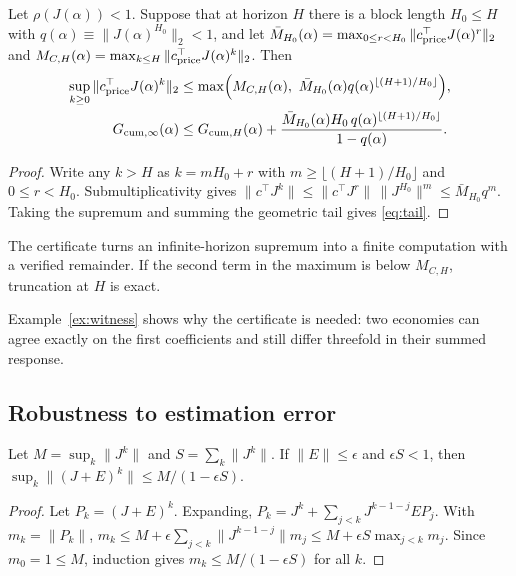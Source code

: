 \begin{lemma}\label{lem:tail}
Let $\rho(J(\alpha))<1$. Suppose that at horizon $H$ there is a block length $H_0\le H$ with $q(\alpha)\equiv\|J(\alpha)^{H_0}\|_2<1$, and let $\bar M_{H_0}(\alpha)=\max_{0\le r<H_0}\|c^\top_{\rm price}J(\alpha)^r\|_2$ and $M_{C,H}(\alpha)=\max_{k\le H}\|c^\top_{\rm price}J(\alpha)^k\|_2$. Then
\begin{align}
\sup_{k\ge0}\|c^\top_{\rm price}J(\alpha)^k\|_2&\le\max\Bigl(M_{C,H}(\alpha),\ \bar M_{H_0}(\alpha)q(\alpha)^{\lfloor(H+1)/H_0\rfloor}\Bigr),\label{eq:tail}\\
G_{{\rm cum},\infty}(\alpha)&\le G_{{\rm cum},H}(\alpha)+\frac{\bar M_{H_0}(\alpha)H_0\,q(\alpha)^{\lfloor(H+1)/H_0\rfloor}}{1-q(\alpha)}.\notag
\end{align}
\end{lemma}

\begin{proof}
Write any $k>H$ as $k=mH_0+r$ with $m\ge\lfloor(H+1)/H_0\rfloor$ and $0\le r<H_0$. Submultiplicativity gives $\|c^\top J^k\|\le\|c^\top J^r\|\,\|J^{H_0}\|^m\le\bar M_{H_0}q^m$. Taking the supremum and summing the geometric tail gives \eqref{eq:tail}.
\end{proof}

The certificate turns an infinite-horizon supremum into a finite computation with a verified remainder. If the second term in the maximum is below $M_{C,H}$, truncation at $H$ is exact.

Example~\ref{ex:witness} shows why the certificate is needed: two economies can agree exactly on the first coefficients and still differ threefold in their summed response.

\subsection{Robustness to estimation error}

\begin{theorem}\label{thm:robust}
Let $M=\sup_k\|J^k\|$ and $S=\sum_k\|J^k\|$. If $\|E\|\le\epsilon$ and $\epsilon S<1$, then $\sup_k\|(J+E)^k\|\le M/(1-\epsilon S)$.
\end{theorem}

\begin{proof}
Let $P_k=(J+E)^k$. Expanding, $P_k=J^k+\sum_{j<k}J^{k-1-j}EP_j$. With $m_k=\|P_k\|$, $m_k\le M+\epsilon\sum_{j<k}\|J^{k-1-j}\|m_j\le M+\epsilon S\max_{j<k}m_j$. Since $m_0=1\le M$, induction gives $m_k\le M/(1-\epsilon S)$ for all $k$.
\end{proof}

